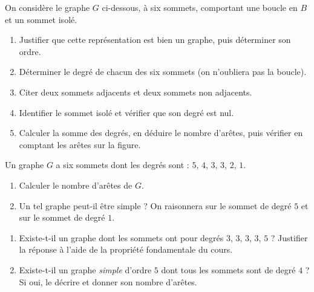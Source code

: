\documentclass[11pt]{article}
\newcommand{\cle}[1]{{\popxbold\color{popdark}#1}}
\newcommand{\legende}[1]{\par\vspace{6pt}{\popsemi\fontsize{9}{11.5}\selectfont\color{popmuted}#1}}
\begin{document}
\begin{exercice}
On considère le graphe $G$ ci-dessous, à six sommets, comportant une boucle en $B$ et un sommet isolé.
\begin{popfigure}
\legende{Graphe $G$ : le sommet $F$ est isolé}
\end{popfigure}
\begin{enumerate}
\item Justifier que cette représentation est bien un graphe, puis déterminer son ordre.
\item Déterminer le degré de chacun des six sommets (on n'oubliera pas la boucle).
\item Citer deux sommets adjacents et deux sommets non adjacents.
\item Identifier le sommet isolé et vérifier que son degré est nul.
\item Calculer la somme des degrés, en déduire le nombre d'arêtes, puis vérifier en comptant les arêtes sur la figure.
\end{enumerate}
\end{exercice}

\begin{exercice}
Un graphe $G$ a six sommets dont les degrés sont : $5$, $4$, $3$, $3$, $2$, $1$.
\begin{enumerate}
\item Calculer le nombre d'arêtes de $G$.
\item Un tel graphe peut-il être \cle{simple} ? On raisonnera sur le sommet de degré $5$ et sur le sommet de degré $1$.
\end{enumerate}
\end{exercice}

\begin{exercice}
\begin{enumerate}
\item Existe-t-il un graphe dont les sommets ont pour degrés $3$, $3$, $3$, $3$, $5$ ? Justifier la réponse à l'aide de la propriété fondamentale du cours.
\item Existe-t-il un graphe \emph{simple} d'ordre $5$ dont tous les sommets sont de degré $4$ ? Si oui, le décrire et donner son nombre d'arêtes.
\end{enumerate}
\end{exercice}
\end{document}
